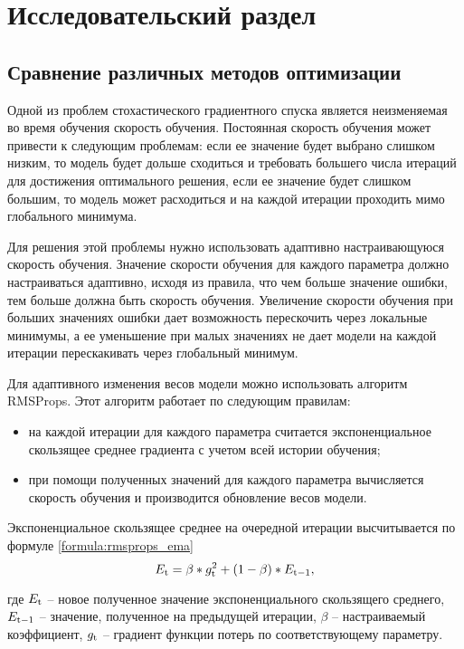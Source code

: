 \chapter{Исследовательский раздел}

\section{Сравнение различных методов оптимизации}

Одной из проблем стохастического градиентного спуска является неизменяемая во время обучения скорость обучения. Постоянная скорость обучения может привести к следующим проблемам: если ее значение будет выбрано слишком низким, то модель будет дольше сходиться и требовать большего числа итераций для достижения оптимального решения, если ее значение будет слишком большим, то модель может расходиться и на каждой итерации проходить мимо глобального минимума.

Для решения этой проблемы нужно использовать адаптивно настраивающуюся скорость обучения. Значение скорости обучения для каждого параметра должно настраиваться адаптивно, исходя из правила, что чем больше значение ошибки, тем больше должна быть скорость обучения. Увеличение скорости обучения при больших значениях ошибки дает возможность перескочить через локальные минимумы, а ее уменьшение при малых значениях не дает модели на каждой итерации перескакивать через глобальный минимум.

Для адаптивного изменения весов модели можно использовать алгоритм RMSProps. Этот алгоритм работает по следующим правилам:
\begin{itemize}
	\item на каждой итерации для каждого параметра считается экспоненциальное скользящее среднее градиента с учетом всей истории обучения;
	\item при помощи полученных значений для каждого параметра вычисляется скорость обучения и производится обновление весов модели.
\end{itemize}

Экспоненциальное скользящее среднее на очередной итерации высчитывается по формуле \ref{formula:rmsprops_ema}
\begin{equation}\label{formula:rmsprops_ema}
E_{\rm{t}} = \beta * g_{\rm{t}}^2 + (1 - \beta) * E_{\rm{t-1}},
\end{equation}

где $E_{\rm{t}}$ -- новое полученное значение экспоненциального скользящего среднего, $E_{\rm{t-1}}$ -- значение, полученное на предыдущей итерации, $\beta$ -- настраиваемый коэффициент, $g_{\rm{t}}$ -- градиент функции потерь по соответствующему параметру.

